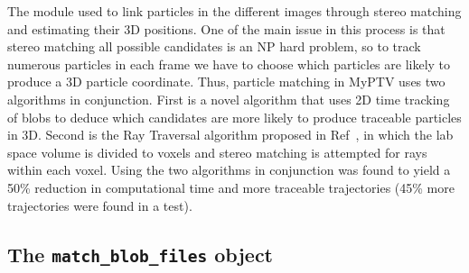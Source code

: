 \documentclass[10pt,a4paper]{article}
\begin{document}
The module used to link particles in the different images through stereo matching and estimating their 3D positions. One of the main issue in this process is that stereo matching all possible candidates is an NP hard problem, so to track numerous particles in each frame we have to choose which particles are likely to produce a 3D particle coordinate. Thus, particle matching in MyPTV uses two algorithms in conjunction. First is a novel algorithm that uses 2D time tracking of blobs to deduce which candidates are more likely to produce traceable particles in 3D. Second is the Ray Traversal algorithm proposed in Ref~\cite{Bourgoin2020}, in which the lab space volume is divided to voxels and stereo matching is attempted for rays within each voxel. Using the two algorithms in conjunction was found to yield a 50\% reduction in computational time and more traceable trajectories (45\% more trajectories were found in a test). 




\subsection{The \texttt{match\_blob\_files} object}
\end{document}
